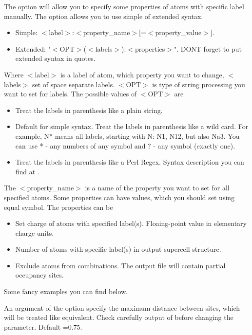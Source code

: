 \documentclass[a4paper,english]{article}
\begin{document}
\begin{Description}
\item[\OptArg{-p }{labels-properties}, \OptArg{--property=}{labels-properties}]
      The option will allow you to specify some properties of atoms with specific label manually. The option allows you to use simple of extended syntax. 
       \begin{itemize}
         \item Simple: $<$label$>$:$<$property\_name$>$[=$<$property\_value$>$].
         \item Extended: "$<$OPT$>$($<$labels$>$):{$<$properties$>$}". DONT forget to put extended syntax in quotes.
       \end{itemize}
       Where $<$label$>$ is a label of atom, which property you want to change, $<$labels$>$ set of space separate labels. $<$OPT$>$ is type of string processing you want to set for labels. The possible values of $<$OPT$>$ are
       \begin{itemize}
         \item[p] Treat the labels in parenthesis like a plain string. 
         \item[w, ""] Default for simple syntax. Treat the labels in parenthesis like a wild card. For example, N* means all labels, starting with N: N1, N12, but also Na3. You can use * - any numbers of any symbol and ? - any symbol (exactly one).
         \item[r] Treat the labels in parenthesis like a Perl Regex. Syntax description you can find at .
       \end{itemize}
       The $<$property\_name$>$ is a name of the property you want to set for all specified atoms. Some properties can have values, which you should set using equal symbol. The properties can be
       \begin{itemize}
         \item[c\Lbr charge\Rbr] Set charge of atoms with specified label(s). Floaing-point value in elementary charge units.
         \item[p\Lbr opulation\Rbr] Number of atoms with specific label(s) in output supercell structure.
         \item[\Lbr not\Rbr fixed] Exclude atoms from combinations. The output file will contain partial occupancy sites.
       \end{itemize}
       Some fancy examples you can find below.       
      
\item[\OptArg{-t }{tolerance}, \OptArg{--tolerance=}{tolerance}]
      An argument of the option specify the maximum distance between sites, which will be treated like equivalent.     Check carefully output of  before changing the parameter. Default =0.75.


\end{Description}
\end{document}
